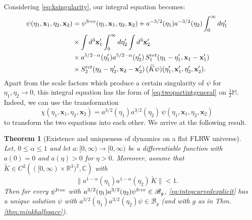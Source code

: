 \documentclass[b5paper,draft,openbib,12pt]{memoir}
\newtheorem{Thm}[Def]{Theorem}
\newcommand{\R}{\mathbb{R}}
\newcommand{\CC}{\mathbb{C}}
\newcommand{\M}{\mathbb{M}}
\newcommand{\vx}{\mathbf{x}}
\newcommand{\ret}{{\textup ret}}
\newcommand{\free}{{\textup free}}
\newcommand{\Banach}{\mathscr{B}}
\begin{document}
Considering \eqref{eq:ksingularity}, our integral equation becomes:
\begin{align}\nonumber
  \psi(\eta_1,\vx_1,\eta_2,\vx_2) &= \psi^\free(\eta_1,\vx_1,\eta_2,\vx_2) + a^{-3/2}(\eta_1) a^{-3/2}(\eta_2) \int_0^\infty d \eta_1' \\
  &\times \int d^3 \vx_1' \int_0^\infty d \eta_2' \int d^3 \vx_2'\nonumber\\\nonumber
  &\times a^{5/2-\alpha}(\eta_1') a^{5/2-\alpha}(\eta_2') \, S_1^\ret(\eta_1-\eta_1', \vx_1-\vx_1')\\
  &\times  S_2^\ret(\eta_2-\eta_2',\vx_2-\vx_2') \, (\widetilde{K} \psi)(\eta_1',\vx_1',\eta_2',\vx_2').
\label{eq:inteqcurvedexplicit}
\end{align}
Apart from the scale factors which produce a certain singularity of 
$\psi$ for $\eta_1,\eta_2 \rightarrow 0$, this integral equation has 
the form of \eqref{eq:twopartintgeneral} on $\frac{1}{2}\M$. Indeed, we can use 
the transformation
\begin{equation}
	\chi(\eta_1,\vx_1,\eta_2,\vx_2) = a^{3/2}(\eta_1) a^{3/2}(\eta_2)\, \psi(\eta_1,\vx_1,\eta_2,\vx_2)
	\label{eq:psichi}
\end{equation}
to transform the two equations into each other. We arrive at the 
following result.

\begin{Thm}[Existence and uniqueness of dynamics on a flat 
  FLRW universe] \label{thm:flrw}
	Let, $0 \leq \alpha \leq 1$ and let $a : [0,\infty) \rightarrow [0,\infty)$ be a differentiable function with $a(0)=0$ and $a(\eta) >0$ for $\eta>0$. Moreover, assume that $\widetilde{K} \in C^2 \left( ([0,\infty)\times \R^3)^2,\CC\right)$ with
  \begin{equation}
		\| a^{1-\alpha}(\eta_1) a^{1-\alpha}(\eta_2) \, \widetilde{K} \| <1.
	\label{eq:ktildecondition}
	\end{equation}
 Then for every $\psi^\free$ with 
 $a^{3/2}(\eta_1) a^{3/2}(\eta_2) \psi^\free \in \Banach_g$, 
 \eqref{eq:inteqcurvedexplicit} has a unique solution $\psi$ with 
 $a^{3/2}(\eta_1) a^{3/2}(\eta_2)\psi \in \Banach_g$ (and with \(g\) 
 as in Thm. \ref{thm:minkhalfspace}).
\end{Thm}
\end{document}
